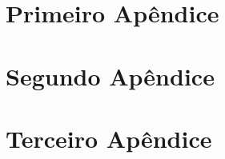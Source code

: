 \begin{apendicesenv}

\partapendices



\chapter{Primeiro Apêndice}

\chapter{Segundo Apêndice}

\chapter{Terceiro Apêndice}



\end{apendicesenv}
